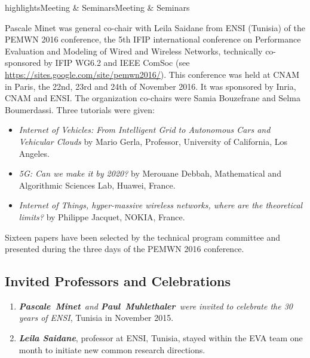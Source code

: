 \documentclass{ra2016}
\newcommand{\paul}  {\textbf{Paul~Muhlethaler}}
\newcommand{\pascale} {\textbf{Pascale~Minet}}
\begin{document}
\begin{module}{highlights}{Meeting \& Seminars}{Meeting \& Seminars}
\begin{enumerate}
Pascale Minet was general co-chair with Leila Saidane from ENSI (Tunisia) of the PEMWN 2016 conference, the 5th IFIP international conference on Performance Evaluation and Modeling of Wired and Wireless Networks, technically co-sponsored by IFIP WG6.2 and IEEE ComSoc (see \url{https://sites.google.com/site/pemwn2016/}). This conference was held  at CNAM in Paris, the 22nd, 23rd and 24th of November 2016. It was sponsored by Inria, CNAM and ENSI. The organization co-chairs were Samia Bouzefrane and Selma Boumerdassi. Three tutorials were given:
\begin{itemize}
\item  \emph{Internet of Vehicles: From Intelligent Grid to Autonomous Cars and Vehicular Clouds} by Mario Gerla, Professor, University of California, Los Angeles.
\item \emph{5G: Can we make it by 2020?} by  Merouane Debbah,  Mathematical and Algorithmic Sciences Lab, Huawei, France.
\item \emph{ Internet of Things, hyper-massive wireless networks, where are the theoretical limits?} by Philippe Jacquet, NOKIA, France.
\end{itemize}
Sixteen papers have been selected by the technical program committee and presented during the three days of the PEMWN 2016 conference.\\
    
\end{enumerate}

\subsection{Invited Professors and Celebrations}
\begin{enumerate}
    \item \textit{\pascale~and \paul~were invited to celebrate the 30 years of ENSI}, Tunisia in November 2015.
    \item \textit{\textbf{Leila Saidane}}, professor at ENSI, Tunisia, stayed within the EVA team one month to initiate new common research directions.
\end{enumerate} 

\end{module}
\end{document}
